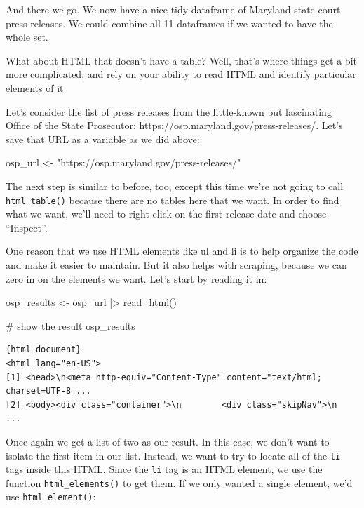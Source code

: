 \documentclass[
  letterpaper,
  DIV=11,
  numbers=noendperiod]{scrreprt}
\newenvironment{Shaded}{\begin{snugshade}}{\end{snugshade}}
\newcommand{\CommentTok}[1]{\textcolor[rgb]{0.37,0.37,0.37}{#1}}
\newcommand{\FunctionTok}[1]{\textcolor[rgb]{0.28,0.35,0.67}{#1}}
\newcommand{\NormalTok}[1]{\textcolor[rgb]{0.00,0.23,0.31}{#1}}
\newcommand{\OtherTok}[1]{\textcolor[rgb]{0.00,0.23,0.31}{#1}}
\newcommand{\SpecialCharTok}[1]{\textcolor[rgb]{0.37,0.37,0.37}{#1}}
\newcommand{\StringTok}[1]{\textcolor[rgb]{0.13,0.47,0.30}{#1}}
\begin{document}
And there we go. We now have a nice tidy dataframe of Maryland state
court press releases. We could combine all 11 dataframes if we wanted to
have the whole set.

What about HTML that doesn't have a table? Well, that's where things get
a bit more complicated, and rely on your ability to read HTML and
identify particular elements of it.

Let's consider the list of press releases from the little-known but
fascinating Office of the State Prosecutor:
https://osp.maryland.gov/press-releases/. Let's save that URL as a
variable as we did above:

\begin{Shaded}
\begin{Highlighting}[]
\NormalTok{osp\_url }\OtherTok{\textless{}{-}} \StringTok{"https://osp.maryland.gov/press{-}releases/"}
\end{Highlighting}
\end{Shaded}

The next step is similar to before, too, except this time we're not
going to call \texttt{html\_table()} because there are no tables here
that we want. In order to find what we want, we'll need to right-click
on the first release date and choose ``Inspect''.

One reason that we use HTML elements like ul and li is to help organize
the code and make it easier to maintain. But it also helps with
scraping, because we can zero in on the elements we want. Let's start by
reading it in:

\begin{Shaded}
\begin{Highlighting}[]
\NormalTok{osp\_results }\OtherTok{\textless{}{-}}\NormalTok{ osp\_url }\SpecialCharTok{|\textgreater{}}
  \FunctionTok{read\_html}\NormalTok{()}

\CommentTok{\# show the result}
\NormalTok{osp\_results}
\end{Highlighting}
\end{Shaded}

\begin{verbatim}
{html_document}
<html lang="en-US">
[1] <head>\n<meta http-equiv="Content-Type" content="text/html; charset=UTF-8 ...
[2] <body><div class="container">\n        <div class="skipNav">\n            ...
\end{verbatim}

Once again we get a list of two as our result. In this case, we don't
want to isolate the first item in our list. Instead, we want to try to
locate all of the \texttt{li} tags inside this HTML. Since the
\texttt{li} tag is an HTML element, we use the function
\texttt{html\_elements()} to get them. If we only wanted a single
element, we'd use \texttt{html\_element()}:
\end{document}
